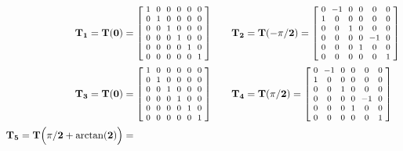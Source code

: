 \begin{align*}
\mathbf{T_1}=\mathbf{T(0)} &=
{\arraycolsep=3pt\medmuskip=0.8mu\footnotesize
\left[
\begin{array}{cccccc}
 1 & 0 & 0 & 0 & 0 & 0 \\
 0 & 1 & 0 & 0 & 0 & 0 \\
 0 & 0 & 1 & 0 & 0 & 0 \\
 0 & 0 & 0 & 1 & 0 & 0 \\
 0 & 0 & 0 & 0 & 1 & 0 \\
 0 & 0 & 0 & 0 & 0 & 1 \\
\end{array}
 \right]
 }
\qquad
\mathbf{T_2}=\mathbf{T(-\pi/2)} =
{\arraycolsep=3pt\medmuskip=0.8mu\footnotesize
\left[
\begin{array}{cccccc}
 0 & -1 & 0 & 0 & 0 & 0 \\
 1 & 0 & 0 & 0 & 0 & 0 \\
 0 & 0 & 1 & 0 & 0 & 0 \\
 0 & 0 & 0 & 0 & -1 & 0 \\
 0 & 0 & 0 & 1 & 0 & 0 \\
 0 & 0 & 0 & 0 & 0 & 1 \\
\end{array}
 \right]
 }
 \\
 \mathbf{T_3}=\mathbf{T(0)} &=
{\arraycolsep=3pt\medmuskip=0.8mu\footnotesize
\left[
\begin{array}{cccccc}
 1 & 0 & 0 & 0 & 0 & 0 \\
 0 & 1 & 0 & 0 & 0 & 0 \\
 0 & 0 & 1 & 0 & 0 & 0 \\
 0 & 0 & 0 & 1 & 0 & 0 \\
 0 & 0 & 0 & 0 & 1 & 0 \\
 0 & 0 & 0 & 0 & 0 & 1 \\
\end{array}
 \right]
 } 
 \qquad
 \mathbf{T_4}=\mathbf{T(\pi/2)} =
{\arraycolsep=3pt\medmuskip=0.8mu\footnotesize
\left[
\begin{array}{cccccc}
 0 & -1 & 0 & 0 & 0 & 0 \\
 1 & 0 & 0 & 0 & 0 & 0 \\
 0 & 0 & 1 & 0 & 0 & 0 \\
 0 & 0 & 0 & 0 & -1 & 0 \\
 0 & 0 & 0 & 1 & 0 & 0 \\
 0 & 0 & 0 & 0 & 0 & 1 \\
\end{array}
 \right]
 }
\\
\mathbf{T_5}=\mathbf{T\Big(\pi/2 + \arctan(2)\Big)} &=

\end{align*}
